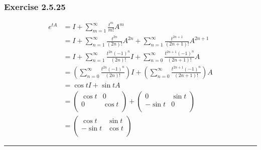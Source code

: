 \documentclass[12pt, letterpaper]{scrartcl}
\begin{document}
\subsubsection*{Exercise 2.5.25}
\begin{align*}
    e^{tA}&=I + \sum_{m=1}^\infty\frac{t^m}{m!}A^m\\
    &=I + \sum_{n=1}^\infty\frac{t^{2n}}{(2n)!}A^{2n} + \sum_{n=1}^\infty\frac{t^{2n+1}}{(2n+1)!}A^{2n+1}\\
    &=I+\sum_{n=1}^\infty\frac{t^{2n}(-1)^n}{(2n)!}I + \sum_{n=0}^\infty\frac{t^{2n+1}(-1)^n}{(2n+1)!}A\\
    &=\left(\sum_{n=0}^\infty\frac{t^{2n}(-1)^n}{(2n)!}\right)I + \left(\sum_{n=0}^\infty\frac{t^{2n+1}(-1)^n}{(2n+1)!}\right)A\\
    &=\cos t I + \sin t A\\
    &=\left(\begin{array}{cc}
        \cos t & 0 \\
        0 & \cos t \\
    \end{array}\right)+
    \left(\begin{array}{cc}
        0 & \sin t \\
        -\sin t & 0 \\
    \end{array}\right)\\
    &=\left(\begin{array}{cc}
        \cos t & \sin t \\
        -\sin t & \cos t \\
    \end{array}\right)
\end{align*}
\vskip1mm\hrule
\end{document}
